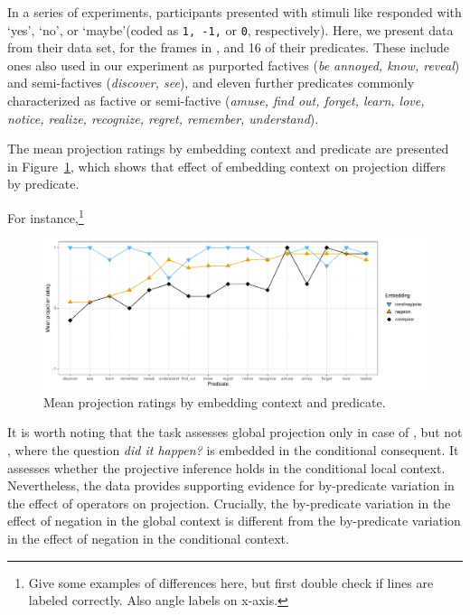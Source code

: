 \documentclass[a4paper,12pt,twoside]{article}
\begin{document}
			In a series of experiments, participants presented with stimuli like \Last responded with \lq yes\rq, \lq no\rq, or  \lq maybe\rq (coded as \texttt{1, -1,} or \texttt{0}, respectively). Here, we present data from their data set, for the frames in \Last, and 16 of their predicates. These include ones also used in our experiment as purported factives (\textit{be annoyed, know, reveal}) and semi-factives (\textit{discover, see}), and eleven further predicates commonly characterized as factive or semi-factive (\textit{amuse, find out, forget, learn, love, notice, realize, recognize, regret, remember, understand}).

			The mean projection ratings by embedding context and predicate are presented in Figure~\ref{fig:figure4}, which shows that effect of embedding context on projection differs by predicate.

			For instance,\footnote{Give some examples of differences here, but first double check if lines are labeled correctly. Also angle labels on x-axis.}


			\begin{figure}[ht]
				\centering
				\includegraphics[width = \linewidth]{mega-veridicality}
				\caption{Mean projection ratings by embedding context and predicate.}
				\label{fig:figure4}
			\end{figure}

			It is worth noting that the task assesses global projection only in case of \Last[a], but not \Last[b+c], where the question \textit{did it happen?} is embedded in the conditional consequent. It assesses whether the projective inference holds in the conditional local context. Nevertheless, the data provides supporting evidence for by-predicate variation in the effect of operators on projection. Crucially, the by-predicate variation in the effect of negation in the global context is different from the by-predicate variation in the effect of negation in the conditional context.
\end{document}
